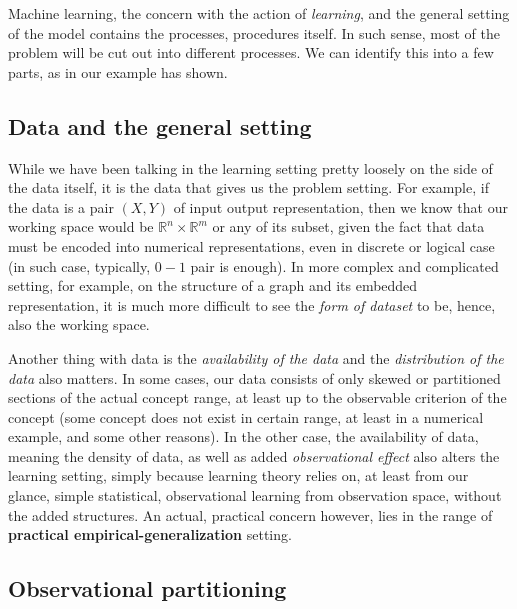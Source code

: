 Machine learning, the concern with the action of \textit{learning}, and the general setting of the model contains the processes, procedures itself. In such sense, most of the problem will be cut out into different processes. We can identify this into a few parts, as in our example has shown. 

\subsection{Data and the general setting}
While we have been talking in the learning setting pretty loosely on the side of the data itself, it is the data that gives us the problem setting. For example, if the data is a pair $(X,Y)$ of input output representation, then we know that our working space would be $\mathbb{R}^n \times \mathbb{R}^m$ or any of its subset, given the fact that data must be encoded into numerical representations, even in discrete or logical case (in such case, typically, $0-1$ pair is enough). In more complex and complicated setting, for example, on the structure of a graph and its embedded representation, it is much more difficult to see the \textit{form of dataset} to be, hence, also the working space. 

Another thing with data is the \textit{availability of the data} and the \textit{distribution of the data} also matters. In some cases, our data consists of only skewed or partitioned sections of the actual concept range, at least up to the observable criterion of the concept (some concept does not exist in certain range, at least in a numerical example, and some other reasons). In the other case, the availability of data, meaning the density of data, as well as added \textit{observational effect} also alters the learning setting, simply because learning theory relies on, at least from our glance, simple statistical, observational learning from observation space, without the added structures. An actual, practical concern however, lies in the range of \textbf{practical empirical-generalization} setting. 
\subsection{Observational partitioning}

